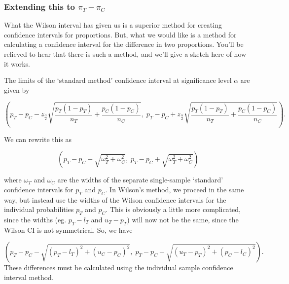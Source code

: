 \documentclass[
  openany]{book}
\theoremstyle{definition}
\theoremstyle{definition}
\theoremstyle{definition}
\theoremstyle{definition}
\theoremstyle{remark}
\begin{document}
\subsubsection{\texorpdfstring{Extending this to \(\pi_T - \pi_C\)}{Extending this to \textbackslash pi\_T - \textbackslash pi\_C}}\label{newcombeci}

What the Wilson interval has given us is a superior method for creating confidence intervals for proportions. But, what we would like is a method for calculating a confidence interval for the difference in two proportions. You'll be relieved to hear that there is such a method, and we'll give a sketch here of how it works.

The limits of the `standard method' confidence interval at significance level \(\alpha\) are given by

\begin{equation}
\left(p_T - p_C - z_{\frac{\alpha}{2}}\sqrt{\frac{p_T\left(1-p_T\right)}{n_T} + \frac{p_C\left(1-p_C\right)}{n_C}},\; p_T - p_C + z_{\frac{\alpha}{2}}\sqrt{\frac{p_T\left(1-p_T\right)}{n_T} + \frac{p_C\left(1-p_C\right)}{n_C}}\right).
\label{eq:ardci}
\end{equation}

We can rewrite this as

\begin{equation}
\left(p_T - p_C - \sqrt{\omega^2_T + \omega^2_C},\; p_T - p_C + \sqrt{\omega^2_T + \omega^2_C}\right)
\end{equation}

where \(\omega_T\) and \(\omega_C\) are the widths of the separate single-sample `standard' confidence intervals for \(p_T\) and \(p_C\). In Wilson's method, we proceed in the same way, but instead use the widths of the Wilson confidence intervals for the individual probabilities \(p_T\) and \(p_C\). This is obviously a little more complicated, since the widths (eg. \(p_T - l_T\) and \(u_T - p_T\)) will now not be the same, since the Wilson CI is not symmetrical. So, we have

\[
\left(p_T - p_C - \sqrt{\left(p_T-l_T\right)^2 + \left(u_C - p_C\right)^2},\; p_T - p_C + \sqrt{\left(u_T - p_T\right)^2 + \left(p_C - l_C\right)^2}\right).
\]
These differences must be calculated using the individual sample confidence interval method.
\end{document}
